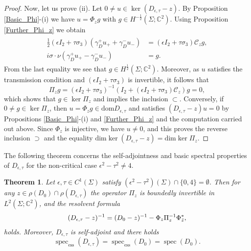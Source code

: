\documentclass[11pt,a4paper,reqno,oneside]{amsproc}
\DeclareMathOperator{\dom}{dom}
\DeclareMathOperator{\spec}{spec}
\newcommand{\spece}{\spec_\mathrm{ess}}
\def \cc {{\mathbb C}}
\numberwithin{equation}{section}
\def\dom{\mathrm{dom}}
\def \cc {{\mathbb{C}}}
\newtheorem{theorem}[definition]{Theorem}
\begin{document}
\begin{proof}
Now, let us prove (ii). Let $0\neq u\in \ker (D_{\epsilon,\tau}-z)$. By Proposition \ref{Basic_Phi}-(i) we have  $u=\Phi_z g$ with $g\in H^{-\frac{1}{2}}(\Sigma;\cc^2)$. Using Proposition \ref{Further_Phi_z} we obtain 
\begin{align}\label{Traceeigen}
\begin{split}
\frac{1}{2}(\epsilon I_2+\tau\sigma_3)(\gamma_D^+ u_+ +\gamma_D^- u_-)&=(\epsilon I_2+\tau\sigma_3)\mathscr{C}_zg,\\
 i\sigma\cdot\nu(\gamma_D^+ u_+ -\gamma_D^- u_-)&=g.
 \end{split}
\end{align}
From the last equality we see that $g\in H^{\frac{1}{2}}(\Sigma;\cc^2)$. Moreover, as $u$ satisfies the transmission condition and $(\epsilon I_2+\tau\sigma_3)$ is invertible, it follows that  
\[
\Pi_zg= (\epsilon I_2+\tau\sigma_3)^{-1}\left( I_2+ (\epsilon I_2+\tau\sigma_3)\mathscr{C}_z\right)g=0,
\]
which shows that $g\in\ker \Pi_z$ and implies the inclusion $\subset$. Conversely, if $0\neq g\in\ker \Pi_z$, then $u=\Phi_z g \in \dom D_{\epsilon,\tau}$ and satisfies $(D_{\epsilon,\tau}-z)u=0$ by Propositions \ref{Basic_Phi}-(i) and \ref{Further_Phi_z} and the computation carried out above. Since $\Phi_z$ is injective, we have $u\neq 0$, and this proves the reverse inclusion $\supset$ and the equality $\mathrm{dim}\ker (D_{\epsilon,\tau}-z)=\mathrm{dim}\ker \Pi_z$. 

\end{proof}
The following theorem concerns the self-adjointness and basic spectral properties of $D_{\epsilon,\tau}$ for the  non-critical case $\epsilon^2-\tau^2\neq 4$. 
\begin{theorem}\label{main_th1}Let $\epsilon,\tau\in C^1(\Sigma)$ satisfy $(\epsilon^2-\tau^2)(\Sigma) \cap\{0, 4\}=\emptyset$. Then for any $z \in \rho(D_0)\cap\rho(D_{\epsilon, \tau})$ the operator $ \Pi_{z}$ is boundedly invertible in $L^2(\Sigma; \mathbb{C}^2)$, and the resolvent formula
			\begin{equation}\label{Krein}
				(D_{\epsilon, \tau} - z)^{-1} = (D_0 - z)^{-1} - \Phi_{z} \Pi_{z}^{-1} \Phi_{\Bar{z}}^*,
\end{equation}				
holds. Moreover, $D_{\epsilon,\tau}$ is self-adjoint and there holds 
 \[
 \spece (D_{\epsilon,\tau})=\spece (D_0)=\spec (D_0).
 \]			
\end{theorem}
\end{document}
